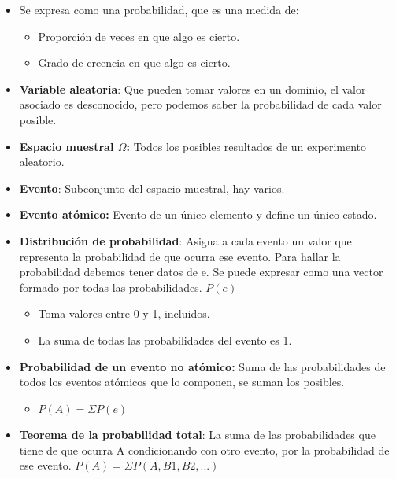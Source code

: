 \documentclass[12pt, twoside, openright]{report} %
\begin{document}
  \begin{itemize}
  \item Se expresa como una probabilidad, que es una medida de:
    

    \begin{itemize}
    \item Proporción de veces en que algo es cierto.
      
    \item Grado de creencia en que algo es cierto.
      
    \end{itemize}
  \item \textbf{Variable aleatoria}: Que pueden tomar valores en un dominio,
    el valor asociado es desconocido, pero podemos saber la probabilidad
    de cada valor posible.
    
  \item \textbf{Espacio muestral $\Omega$:} Todos los posibles resultados de un
    experimento aleatorio.
    
  \item \textbf{Evento}: Subconjunto del espacio muestral, hay varios.
    
  \item \textbf{Evento atómico:} Evento de un único elemento y define un
    único estado.
    
  \item \textbf{Distribución de probabilidad}: Asigna a cada evento un valor
    que representa la probabilidad de que ocurra ese evento. Para hallar
    la probabilidad debemos tener datos de e. Se puede expresar como una
    vector formado por todas las probabilidades. $P(e)$
    

    \begin{itemize}
    \item Toma valores entre 0 y 1, incluidos.
      
    \item La suma de todas las probabilidades del evento es 1.
      
    \end{itemize}
  \item \textbf{Probabilidad de un evento no atómico:} Suma de las
    probabilidades de todos los eventos atómicos que lo componen, se
    suman los posibles.
    

    \begin{itemize}
    \item \textbf{$P(A)=\Sigma P(e)$}
      
    \end{itemize}
  \item \textbf{Teorema de la probabilidad total}: La suma de las
    probabilidades que tiene de que ocurra A condicionando con otro
    evento, por la probabilidad de ese evento. \textbf{$P(A)=\Sigma P(A, B1,B2,...)$}
    

\end{itemize}
\end{document}
